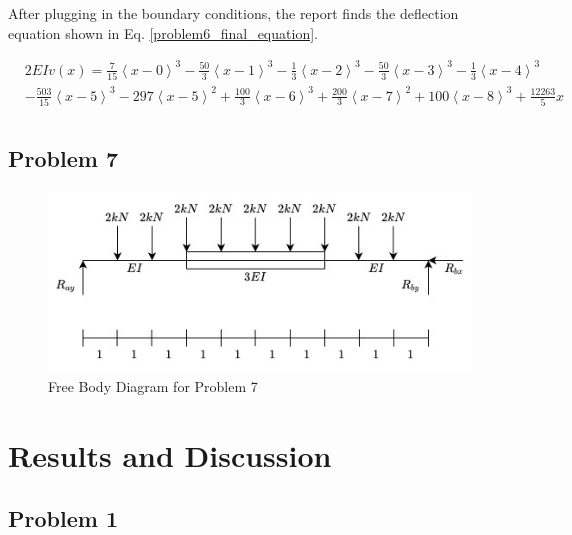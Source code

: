 \documentclass[a4paper]{article}
\begin{document}
After plugging in the boundary conditions, the report finds the deflection equation shown in Eq. \ref{problem6_final_equation}.

\begin{equation}
\begin{split}
  & 2EI v(x) = \frac{7}{15}\left<x-0\right>^3 - \frac{50}{3}\left<x-1\right>^3 -  \frac{1}{3}\left<x-2\right>^3 - \frac{50}{3}\left<x-3\right>^3 - \frac{1}{3}\left<x-4\right>^3 \\
  & - \frac{503}{15}\left<x-5\right>^3 - 297\left<x-5\right>^2 + \frac{100}{3}\left<x-6\right>^3 + \frac{200}{3}\left<x-7\right>^2 + 100\left<x-8\right>^3 + \frac{12263}{5}x\\
\end{split}
\label{problem6_final_equation}
\end{equation}




\subsection{Problem 7}

\begin{figure}[h]
\includegraphics[width=\textwidth]{FBD/FBD_7.jpg}
\caption{Free Body Diagram for Problem 7}
\label{FBD_7}
\end{figure}




\section{Results and Discussion} \label{Results}
\subsection{Problem 1}
\end{document}
